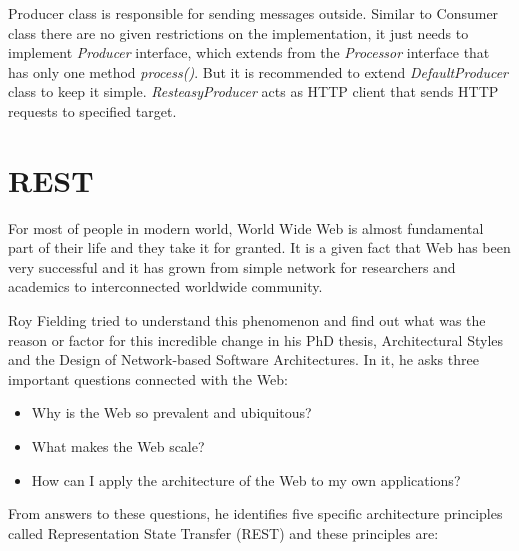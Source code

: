 \documentclass[12pt,final,oneside]{fithesis2}
\begin{document}
Producer class is responsible for sending messages outside. Similar to Consumer class there are no given restrictions on the implementation, it just needs to implement \textit{Producer} interface, which extends from the \textit{Processor} interface that has only one method \textit{process()}. But it is recommended to extend \textit{DefaultProducer} class to keep it simple. \textit{ResteasyProducer} acts as HTTP client that sends HTTP requests to specified target.


\section{REST}
For most of people in modern world, World Wide Web is almost fundamental part of their life and they take it for granted. It is a given fact that Web has been very successful and it has grown from simple network for researchers and academics to interconnected worldwide community. 

Roy Fielding tried to understand this phenomenon and find out what was the reason or factor for this incredible change in his PhD thesis, Architectural Styles and the Design of Network-based Software Architectures\cite{rest-arch}. In it, he asks three important questions connected with the Web:
\begin{itemize}
\item
Why is the Web so prevalent and ubiquitous?

\item 
What makes the Web scale?

\item
How can I apply the architecture of the Web to my own applications?
\end{itemize}

From answers to these questions, he identifies five specific architecture principles called Representation State Transfer (REST) and these principles are:
\end{document}
